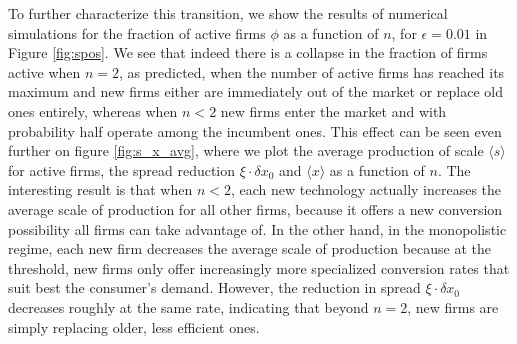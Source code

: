 To further characterize this transition, we show the results of numerical simulations for the fraction of active firms $\phi$ as a function of $n$, for $\epsilon = 0.01$ in Figure \ref{fig:spos}. We see that indeed there is a collapse in the fraction of firms active when $n = 2$, as predicted, when the number of active firms has reached its maximum and new firms either are immediately out of the market or replace old ones entirely, whereas when $n < 2$ new firms enter the market and with probability half operate among the incumbent ones. This effect can be seen even further on figure \ref{fig:s_x_avg}, where we plot the average production of scale $\langle s \rangle$ for active firms, the spread reduction $\xi \cdot \delta x_0$ and $\langle x \rangle$ as a function of $n$. The interesting result is that when $n<2$, each new technology actually increases the average scale of production for all other firms, because it offers a new conversion possibility all firms can take advantage of. In the other hand, in the monopolistic regime, each new firm decreases the average scale of production because at the threshold, new firms only offer increasingly more specialized conversion rates that suit best the consumer's demand. However, the reduction in spread $\xi \cdot \delta x_0$ decreases roughly at the same rate, indicating that beyond $n=2$, new firms are simply replacing older, less efficient ones.

